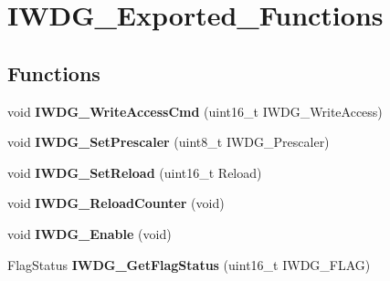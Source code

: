 \hypertarget{group__IWDG__Exported__Functions}{
\section{IWDG\_\-Exported\_\-Functions}
\label{group__IWDG__Exported__Functions}
}
\subsection*{Functions}
\begin{DoxyCompactItemize}
\item 
\hypertarget{group__IWDG__Exported__Functions_gae466681e5bdc11b353c508b89d75ca05}{
void {\bfseries IWDG\_\-WriteAccessCmd} (uint16\_\-t IWDG\_\-WriteAccess)}
\label{group__IWDG__Exported__Functions_gae466681e5bdc11b353c508b89d75ca05}

\item 
\hypertarget{group__IWDG__Exported__Functions_ga4fa7f1cd690533a35ad9e4729c0450a3}{
void {\bfseries IWDG\_\-SetPrescaler} (uint8\_\-t IWDG\_\-Prescaler)}
\label{group__IWDG__Exported__Functions_ga4fa7f1cd690533a35ad9e4729c0450a3}

\item 
\hypertarget{group__IWDG__Exported__Functions_gae2a14752a0431f23cb80cebf202ac365}{
void {\bfseries IWDG\_\-SetReload} (uint16\_\-t Reload)}
\label{group__IWDG__Exported__Functions_gae2a14752a0431f23cb80cebf202ac365}

\item 
\hypertarget{group__IWDG__Exported__Functions_ga7147ebabdc3fef97f532b171a4e70d49}{
void {\bfseries IWDG\_\-ReloadCounter} (void)}
\label{group__IWDG__Exported__Functions_ga7147ebabdc3fef97f532b171a4e70d49}

\item 
\hypertarget{group__IWDG__Exported__Functions_ga479b2921c86f8c67b819f5c4bea6bdb6}{
void {\bfseries IWDG\_\-Enable} (void)}
\label{group__IWDG__Exported__Functions_ga479b2921c86f8c67b819f5c4bea6bdb6}

\item 
\hypertarget{group__IWDG__Exported__Functions_ga37f050cfbedc0c15f9e0816c0b22011e}{
FlagStatus {\bfseries IWDG\_\-GetFlagStatus} (uint16\_\-t IWDG\_\-FLAG)}
\label{group__IWDG__Exported__Functions_ga37f050cfbedc0c15f9e0816c0b22011e}

\end{DoxyCompactItemize}
